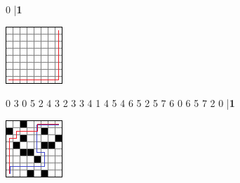 \documentclass{../codeproblem}
\begin{document}
\begin{minipage}{.5\linewidth}
\begin{example}
0
|\textbf{1}\end{example}
\end{minipage}
\begin{minipage}{.5\linewidth}
\includegraphics[width=.5\linewidth]{pics/simplest}
\end{minipage}

\begin{minipage}{.5\linewidth}
\begin{example}
0 3
0 5
2 4
3 2
3 3
4 1
4 5
4 6
5 2
5 7
6 0
6 5
7 2
0
|\textbf{1}\end{example}
\end{minipage}
\begin{minipage}{.5\linewidth}
\includegraphics[width=.6\linewidth]{pics/example}
\end{minipage}
\end{document}
